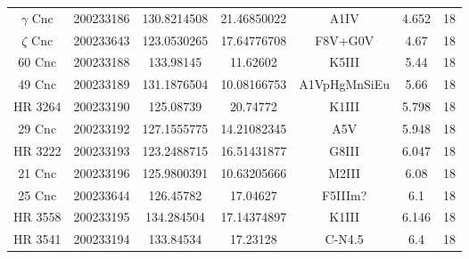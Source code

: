 \begin{table*}
\begin{tabular}{ccccccc}
$\gamma$ Cnc & 200233186 & 130.8214508 & 21.46850022 & A1IV & 4.652 & 18 \\
$\zeta$ Cnc & 200233643 & 123.0530265 & 17.64776708 & F8V+G0V & 4.67 & 18 \\
60 Cnc & 200233188 & 133.98145 & 11.62602 & K5III & 5.44 & 18 \\
49 Cnc & 200233189 & 131.1876504 & 10.08166753 & A1VpHgMnSiEu & 5.66 & 18 \\
HR 3264 & 200233190 & 125.08739 & 20.74772 & K1III & 5.798 & 18 \\
29 Cnc & 200233192 & 127.1555775 & 14.21082345 & A5V & 5.948 & 18 \\
HR 3222 & 200233193 & 123.2488715 & 16.51431877 & G8III & 6.047 & 18 \\
21 Cnc & 200233196 & 125.9800391 & 10.63205666 & M2III & 6.08 & 18 \\
25 Cnc & 200233644 & 126.45782 & 17.04627 & F5IIIm? & 6.1 & 18 \\
HR 3558 & 200233195 & 134.284504 & 17.14374897 & K1III & 6.146 & 18 \\
HR 3541 & 200233194 & 133.84534 & 17.23128 & C-N4.5 & 6.4 & 18 \\
\hline
\end{tabular}
\end{table*}

